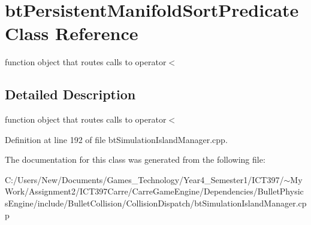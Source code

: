 \hypertarget{classbt_persistent_manifold_sort_predicate}{
\section{btPersistentManifoldSortPredicate Class Reference}
\label{classbt_persistent_manifold_sort_predicate}
}
function object that routes calls to operator$<$  




\subsection{Detailed Description}
function object that routes calls to operator$<$ 

Definition at line 192 of file btSimulationIslandManager.cpp.

The documentation for this class was generated from the following file:\begin{CompactItemize}
\item 
C:/Users/New/Documents/Games\_\-Technology/Year4\_\-Semester1/ICT397/$\sim$My Work/Assignment2/ICT397Carre/CarreGameEngine/Dependencies/BulletPhysicsEngine/include/BulletCollision/CollisionDispatch/btSimulationIslandManager.cpp\end{CompactItemize}
